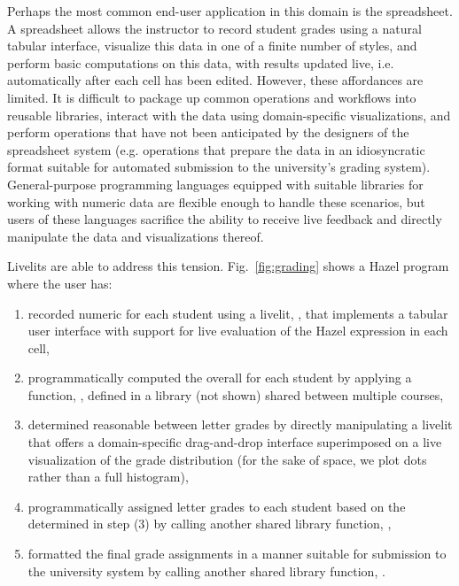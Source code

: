 Perhaps the most common end-user application in this domain is the spreadsheet.
A spreadsheet allows the instructor to record student grades using a natural tabular interface,
visualize this data in one of a finite number of styles, and perform basic computations on this data,
with results updated live, i.e. automatically after each cell has been edited.
However, these affordances are limited. It is difficult to package up common operations and workflows
into reusable libraries, interact with the data using domain-specific visualizations,
and perform operations that have not been anticipated by the designers of the spreadsheet system
(e.g. operations that prepare the data in an idiosyncratic format suitable for automated submission
to the university's grading system).
General-purpose programming languages equipped with suitable libraries for working with numeric data
are flexible enough to handle these scenarios, but users of these languages
sacrifice the ability to receive live feedback and directly manipulate the data and visualizations thereof.

Livelits are able to address this tension.
Fig.~\ref{fig:grading} shows a Hazel program where the user has:
\begin{enumerate}
\item recorded numeric  for each student using a livelit, , that implements a tabular user interface with support for live evaluation of the Hazel expression in each cell,
\item programmatically computed the overall  for each student by applying a function, , defined in a library  (not shown) shared between multiple courses,
\item determined reasonable  between letter grades by directly manipulating a livelit that offers a domain-specific drag-and-drop interface superimposed on a live visualization of the grade distribution
(for the sake of space, we plot dots rather than a full histogram),
\item programmatically assigned letter grades to each student based on the  determined in step (3) by calling another shared library function, ,
\item formatted the final grade assignments in a manner suitable for submission to the university system by calling another shared library function, .
\end{enumerate}


